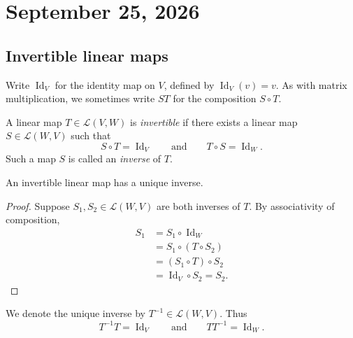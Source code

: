\section{September 25, 2026}

\subsection{Invertible linear maps}

Write $\operatorname{Id}_V$ for the identity map on $V$, defined by
$\operatorname{Id}_V(v)=v$. As with matrix multiplication, we sometimes
write $ST$ for the composition $S\circ T$.

\begin{definition}[Invertibility]
  A linear map $T\in\mathcal L(V,W)$ is \emph{invertible} if there
  exists a linear map $S\in\mathcal L(W,V)$ such that
  \[
    S\circ T=\operatorname{Id}_V
    \qquad\text{and}\qquad
    T\circ S=\operatorname{Id}_W.
  \]
  Such a map $S$ is called an \emph{inverse} of $T$.
\end{definition}

\begin{proposition}
  An invertible linear map has a unique inverse.
\end{proposition}

\begin{proof}
  Suppose $S_1,S_2\in\mathcal L(W,V)$ are both inverses of $T$.
  By associativity of composition,
  \begin{align*}
    S_1
      &=S_1\circ\operatorname{Id}_W \\
      &=S_1\circ(T\circ S_2) \\
      &=(S_1\circ T)\circ S_2 \\
      &=\operatorname{Id}_V\circ S_2=S_2.
  \end{align*}
\end{proof}

We denote the unique inverse by $T^{-1}\in\mathcal L(W,V)$. Thus
\[
  T^{-1}T=\operatorname{Id}_V
  \qquad\text{and}\qquad
  TT^{-1}=\operatorname{Id}_W.
\]

